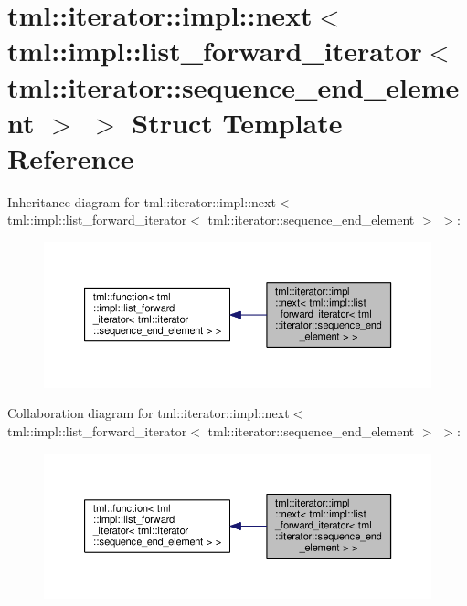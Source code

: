 \hypertarget{structtml_1_1iterator_1_1impl_1_1next_3_01tml_1_1impl_1_1list__forward__iterator_3_01tml_1_1iter83495844ec620c2857fd4fcff65c98c0}{\section{tml\+:\+:iterator\+:\+:impl\+:\+:next$<$ tml\+:\+:impl\+:\+:list\+\_\+forward\+\_\+iterator$<$ tml\+:\+:iterator\+:\+:sequence\+\_\+end\+\_\+element $>$ $>$ Struct Template Reference}
\label{structtml_1_1iterator_1_1impl_1_1next_3_01tml_1_1impl_1_1list__forward__iterator_3_01tml_1_1iter83495844ec620c2857fd4fcff65c98c0}
}


Inheritance diagram for tml\+:\+:iterator\+:\+:impl\+:\+:next$<$ tml\+:\+:impl\+:\+:list\+\_\+forward\+\_\+iterator$<$ tml\+:\+:iterator\+:\+:sequence\+\_\+end\+\_\+element $>$ $>$\+:
\nopagebreak
\begin{figure}[H]
\begin{center}
\leavevmode
\includegraphics[width=350pt]{structtml_1_1iterator_1_1impl_1_1next_3_01tml_1_1impl_1_1list__forward__iterator_3_01tml_1_1iter2b208e1c836628bced3ef163c7d216e0}
\end{center}
\end{figure}


Collaboration diagram for tml\+:\+:iterator\+:\+:impl\+:\+:next$<$ tml\+:\+:impl\+:\+:list\+\_\+forward\+\_\+iterator$<$ tml\+:\+:iterator\+:\+:sequence\+\_\+end\+\_\+element $>$ $>$\+:
\nopagebreak
\begin{figure}[H]
\begin{center}
\leavevmode
\includegraphics[width=350pt]{structtml_1_1iterator_1_1impl_1_1next_3_01tml_1_1impl_1_1list__forward__iterator_3_01tml_1_1iter8915a05663cac3b062b87a94b71bae19}
\end{center}
\end{figure}
